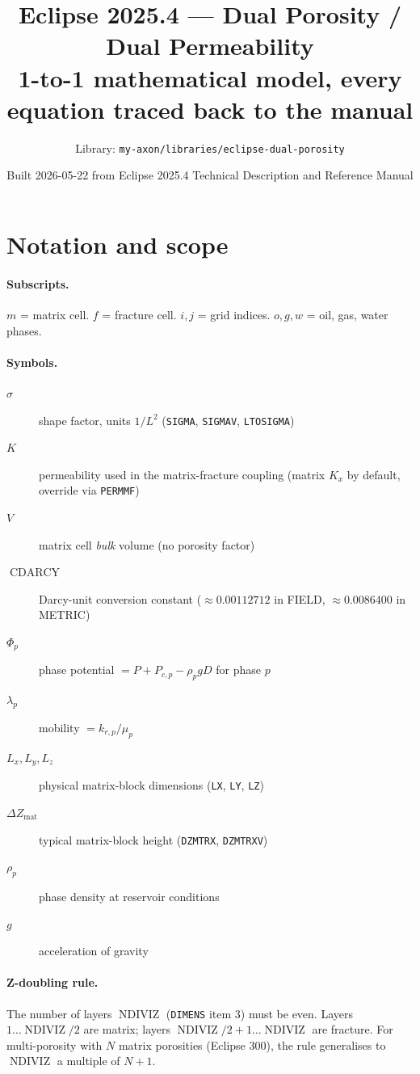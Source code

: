\documentclass[11pt,a4paper]{article}
\title{\textbf{Eclipse 2025.4 — Dual Porosity / Dual Permeability}\\
       \large 1-to-1 mathematical model, every equation traced back to the manual}
\author{Library: \texttt{my-axon/libraries/eclipse-dual-porosity}}
\date{Built 2026-05-22 from Eclipse 2025.4 Technical Description and Reference Manual}
\newcommand{\kw}[1]{\texttt{#1}}
\DeclareMathOperator{\CDARCY}{CDARCY}
\DeclareMathOperator{\NDIVIZ}{NDIVIZ}
\begin{document}
\maketitle

\section{Notation and scope}

\paragraph{Subscripts.} $m$ = matrix cell. $f$ = fracture cell. $i,j$ = grid indices. $o,g,w$ = oil, gas, water phases.

\paragraph{Symbols.}
\begin{description}
  \item[$\sigma$] shape factor, units $1/L^{2}$ (\kw{SIGMA}, \kw{SIGMAV}, \kw{LTOSIGMA})
  \item[$K$] permeability used in the matrix-fracture coupling (matrix $K_x$ by default, override via \kw{PERMMF})
  \item[$V$] matrix cell \emph{bulk} volume (no porosity factor)
  \item[$\CDARCY$] Darcy-unit conversion constant ($\approx 0.00112712$ in FIELD, $\approx 0.0086400$ in METRIC)
  \item[$\Phi_p$] phase potential $= P + P_{c,p} - \rho_p g D$ for phase $p$
  \item[$\lambda_p$] mobility $= k_{r,p}/\mu_p$
  \item[$L_x,L_y,L_z$] physical matrix-block dimensions (\kw{LX}, \kw{LY}, \kw{LZ})
  \item[$\Delta Z_{\text{mat}}$] typical matrix-block height (\kw{DZMTRX}, \kw{DZMTRXV})
  \item[$\rho_p$] phase density at reservoir conditions
  \item[$g$] acceleration of gravity
\end{description}

\paragraph{Z-doubling rule.} The number of layers $\NDIVIZ$ (\kw{DIMENS} item 3) must be even.
Layers $1\ldots\NDIVIZ/2$ are matrix; layers $\NDIVIZ/2+1\ldots\NDIVIZ$ are fracture. For multi-porosity
with $N$ matrix porosities (Eclipse 300), the rule generalises to $\NDIVIZ$ a multiple of $N+1$.
\end{document}
